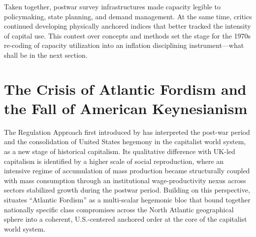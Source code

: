 \documentclass[11pt]{article}
\begin{document}
Taken together, postwar survey infrastructures made capacity legible to policymaking, state planning, and demand management. At the same time, critics continued developing physically anchored indices that better tracked the intensity of capital use. This contest over concepts and methods set the stage for the 1970s re-coding of capacity utilization into an inflation disciplining instrument---what shall be in the next section.


\section{The Crisis of Atlantic Fordism and the Fall of American Keynesianism}

The Regulation Approach first introduced by \citet{aglietta2000} has interpreted the post-war period and the consolidation of United States hegemony in the capitalist world system, as a new stage of historical capitalism. Its qualitative difference with UK-led capitalism is identified by a higher scale of social reproduction, where an intensive regime of accumulation of mass production became structurally coupled with mass consumption through an institutional wage-productivity nexus across sectors stabilized growth during the postwar period. Building on this perspective, \citet{vidal2015} situates ``Atlantic Fordism'' as a multi-scalar hegemonic bloc that bound together nationally specific class compromises across the North Atlantic geographical sphere into a coherent, U.S.-centered anchored order at the core of the capitalist world system.
\end{document}
